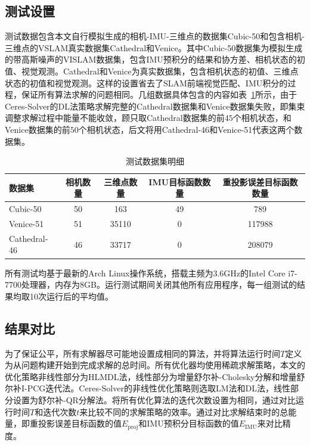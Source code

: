 \subsection{测试设置}

测试数据包含本文自行模拟生成的相机-IMU-三维点的数据集Cubic-50和包含相机-三维点的VSLAM真实数据集Cathedral\citep{kim2014influence}和Venice\citep{kummerle2011g}。其中Cubic-50数据集为模拟生成的带高斯噪声的VISLAM数据集，包含IMU预积分的结果和协方差、相机状态的初值、视觉观测。Cathedral和Venice为真实数据集，包含相机状态的初值、三维点状态的初值和视觉观测。这样的设置省去了SLAM前端视觉匹配、IMU积分的过程，保证所有算法求解的问题相同。几组数据具体包含的内容如表~\ref{tab:dataset}所示，由于Ceres-Solver的DL法策略求解完整的Cathedral数据集和Venice数据集失败，即集束调整求解过程中能量不能收敛，顾只取Cathedral数据集的前$45$个相机状态，和Venice数据集的前$50$个相机状态，后文将用Cathedral-46和Venice-51代表这两个数据集。

{
\linespread{1}
\begin{table}[htb!]
\caption{测试数据集明细}
\label{tab:dataset}
\centering
\begin{tabular}{l|cccc}
    \toprule
    数据集       & 相机数量 & 三维点数量 & IMU目标函数数量 & 重投影误差目标函数数量 \\ \midrule
    Cubic-50     &       50 &        163 &              49 &                    789 \\
    Venice-51    &       51 &      35110 &               0 &                 117988 \\
    Cathedral-46 &       46 &      33717 &               0 &                 208079 \\
    \bottomrule
\end{tabular}
\end{table}
}

所有测试均基于最新的Arch Linux操作系统，搭载主频为3.6GHz的Intel Core i7-7700处理器，内存为8GB。运行测试期间关闭其他所有应用程序，每一组测试的结果均取10次运行后的平均值。

\subsection{结果对比}

为了保证公平，所有求解器尽可能地设置成相同的算法，并将算法运行时间$T$定义为从问题构建开始到完成求解的总时间。所有优化器均使用稀疏求解策略，本文的优化策略非线性部分为HLMDL法，线性部分为增量舒尔补-Cholesky分解和增量舒尔补I-PCG迭代法。Ceres-Solver的非线性优化策略则选取LM法和DL法，线性部分设置为舒尔补-QR分解法。将所有优化算法的迭代次数设置为相同，通过对比运行时间$T$和迭代次数$t$来比较不同的求解策略的效率。通过对比求解结束时的总能量，即重投影误差目标函数的值$E_{\text{proj}}$和IMU预积分目标函数的值$E_{\text{IMU}}$来对比精度。

